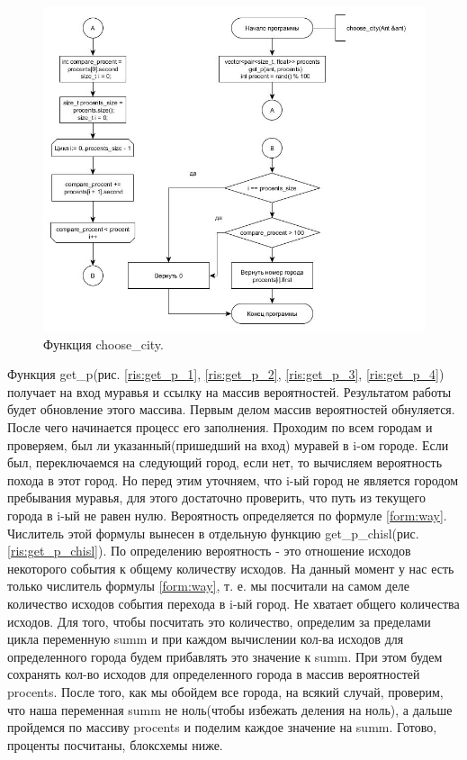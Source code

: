 \documentclass[a4paper, 14pt]{article}
\begin{document}
\begin{figure}[h!]
\center
\includegraphics[scale=0.6]{choose_city.jpg}
\caption{Функция choose\_city.}
\label{ris:choose_city}
\end{figure}\newpage

Функция get\_p(рис. \ref{ris:get_p_1}, \ref{ris:get_p_2}, \ref{ris:get_p_3}, \ref{ris:get_p_4}) получает на вход муравья и ссылку на массив вероятностей. Результатом работы будет обновление этого массива. Первым делом массив вероятностей обнуляется. После чего начинается процесс его заполнения. Проходим по всем городам и проверяем, был ли указанный(пришедший на вход) муравей в i-ом городе. Если был, переключаемся на следующий город, если нет, то вычисляем вероятность похода в этот город. Но перед этим уточняем, что i-ый город не является городом пребывания муравья, для этого достаточно проверить, что путь из текущего города в i-ый не равен нулю. Вероятность определяется по формуле \ref{form:way}. Числитель этой формулы вынесен в отдельную функцию get\_p\_chisl(рис. \ref{ris:get_p_chisl}). По определению вероятность - это отношение исходов некоторого события к общему количеству исходов. На данный момент у нас есть только числитель формулы \ref{form:way}, т. е. мы посчитали на самом деле количество исходов события перехода в i-ый город. Не хватает общего количества исходов. Для того, чтобы посчитать это количество, определим за пределами цикла переменную summ и при каждом вычислении кол-ва исходов для определенного города будем прибавлять это значение к summ. При этом будем сохранять кол-во исходов для определенного города в массив вероятностей procents. После того, как мы обойдем все города, на всякий случай, проверим, что наша переменная summ не ноль(чтобы избежать деления на ноль), а дальше пройдемся по массиву procents и поделим каждое значение на summ. Готово, проценты посчитаны, блоксхемы ниже.\newpage
\end{document}
